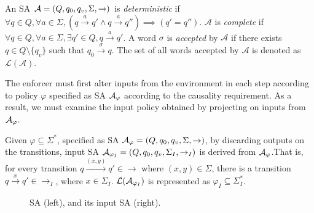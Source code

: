 An SA ${\cal A} = (Q, q_0, q_v, \Sigma, \xrightarrow{})$ is \textit{deterministic} if $\forall
q \in Q, \forall a \in \Sigma, (q \xrightarrow{a} q' \land q \xrightarrow{a}
q'') \implies (q' = q'')$.
$\mathcal{A}$ is \textit{complete} if $\forall q \in Q, \forall a \in \Sigma, \exists q' \in Q, q \xrightarrow{a} q'$.
A word $\sigma$ is \textit{accepted} by $\mathcal{A}$ if there exists $q \in Q \setminus \{q_v\}$ such that $q_0
\xrightarrow{\sigma} q$.
The set of all words accepted by $\mathcal{A}$ is denoted as $\mathcal{L}(\mathcal{A})$.
The enforcer must first alter inputs from the environment in each step according to policy $\varphi$ specified as SA ${\cal A}_\varphi$ according to the causality requirement.
As a result, we must examine the input policy obtained by projecting
on inputs from ${\cal A}_\varphi$. 

\begin{definition}
	\label{def:inp:prop:proj:def}
	Given $\varphi\subseteq\Sigma^*$, specified as SA ${\cal A}_{\varphi}=(Q, q_0, q_v, \Sigma, \rightarrow)$,  by discarding outputs on the transitions, input SA ${\cal A}_{\varphi_I}=(Q, q_0, q_v, \Sigma_I, \rightarrow_I)$ is derived from ${\cal A}_{\varphi}$.That is, for every transition  $q \xrightarrow{(x,y)} q' \in \rightarrow$ where $(x,y) \in \Sigma$, there is a transition  $q \xrightarrow{x} q' \in \rightarrow_I$, where $x \in \Sigma_I$.
	${\cal L}({\cal A}_{\varphi_I})$ is represented as $\varphi_I \subseteq \Sigma_I^*$.
\end{definition}

\begin{figure}[htb]
	\centering
	\hspace{-4.0em}
	\caption[]{SA (left), and its input SA (right). \footnotemark}
	\label{fig:prop:inpProj}
\end{figure}

